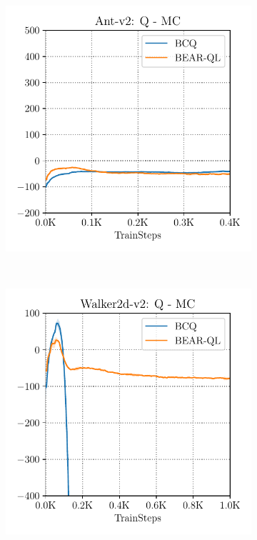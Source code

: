 \begin{figure}[h]
    \centering
    \begin{subfigure}[h]{0.31\textwidth}
        \centering
        \includegraphics[width=0.99\linewidth]{chapters/bear/images/ant_q_vs_mc_1.pdf}
    \end{subfigure}%
    ~
    \begin{subfigure}[h]{0.31\textwidth}
        \centering
        \includegraphics[width=0.99\linewidth]{chapters/bear/images/walker_q_vs_mc.pdf}

\end{subfigure}
\end{figure}
